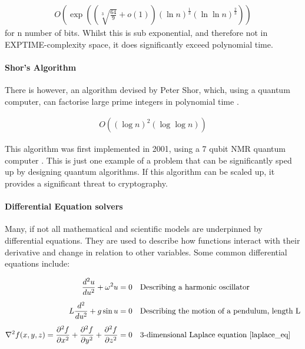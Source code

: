 \begin{align}
	O(\exp((\sqrt[3]{\frac{64}{9}}+o(1))(\ln{n})^{\frac{1}{3}}(\ln\ln{n})^{\frac{2}{3}}))
\end{align}
\noindent
for n number of bits. Whilst this is sub exponential, and therefore not in EXPTIME-complexity space, it does significantly exceed polynomial time. \cite{10.5555/270146}

{}
\paragraph*{Shor's Algorithm}
\noindent
There is however, an algorithm devised by Peter Shor, which, using a quantum computer, can factorise large prime integers in polynomial time \cite{365700}.

\begin{align}
	O((\log{n})^{2}(\log\log{n}))
\end{align}

\noindent
This algorithm was first implemented in 2001, using a 7 qubit NMR quantum computer \cite{Vandersypen_2001}.
This is just one example of a problem that can be significantly sped up by designing quantum algorithms. If this algorithm can be scaled up, it provides a significant threat to cryptography.

{}
\paragraph*{Differential Equation solvers}
\noindent
Many, if not all mathematical and scientific models are underpinned by differential equations. They are used to describe how functions interact with their derivative and change in relation to other variables. Some common differential equations include:

\begin{align}
	\frac{d^{2}u}{du^{2}}+\omega^{2} u                                                                                                    & = 0 &  & \text{Describing a harmonic oscillator}                 \\[0.5em]
	L\frac{d^{2}}{du^{2}}+g\sin{u}                                                                                                        & = 0 &  & \text{Describing the motion of a pendulum, length L}    \\[0.5em]
	\nabla^{2}f(x, y, z) = \frac{\partial^{2}f}{\partial x^{2}}+\frac{\partial^{2}f}{\partial y^{2}}+\frac{\partial^{2}f}{\partial z^{2}} & = 0 &  & \text{3-dimensional Laplace equation \cite{laplace_eq}}
\end{align}


